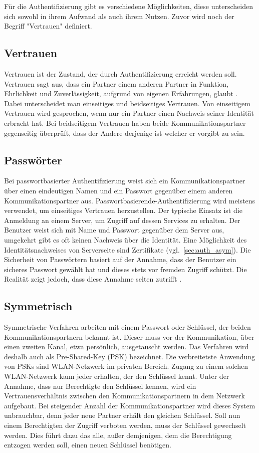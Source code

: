 \documentclass[11pt,a4paper]{report}
\begin{document}
Für die Authentifizierung gibt es verschiedene Möglichkeiten, diese unterscheiden sich sowohl in ihrem Aufwand als auch ihrem Nutzen. Zuvor wird noch der Begriff "Vertrauen" definiert.

\subsection{Vertrauen}

Vertrauen ist der Zustand, der durch Authentifizierung erreicht werden soll. Vertrauen sagt aus, dass ein Partner einem anderen Partner in Funktion, Ehrlichkeit und Zuverlässigkeit, aufgrund von eigenen Erfahrungen, glaubt \cite{chen}. Dabei unterscheidet man einseitiges und beidseitiges Vertrauen. Von einseitigem Vertrauen wird gesprochen, wenn nur ein Partner einen Nachweis seiner Identität erbracht hat. Bei beidseitigem Vertrauen haben beide Kommunikationspartner gegenseitig überprüft, dass der Andere derjenige ist welcher er vorgibt zu sein.

\subsection{Passwörter}

Bei passwortbasierter Authentifizierung weist sich ein Kommunikationspartner über einen eindeutigen Namen und ein Passwort gegenüber einem anderen Kommunikationspartner aus. Passwortbasierende-Authentifizierung wird meistens verwendet, um einseitiges Vertrauen herzustellen. Der typische Einsatz ist die Anmeldung an einem Server, um Zugriff auf dessen Services zu erhalten. Der Benutzer weist sich mit Name und Passwort gegenüber dem Server aus, umgekehrt gibt es oft keinen Nachweis über die Identität. Eine Möglichkeit des Identitätsnachweises von Serverseite sind Zertifikate (vgl.~\ref{sec:auth_asym}). Die Sicherheit von Passwörtern basiert auf der Annahme, dass der Benutzer ein sicheres Passwort gewählt hat und dieses stets vor fremden Zugriff schützt. Die Realität zeigt jedoch, dass diese Annahme selten zutrifft \cite[s.~2]{gutmann}.

\subsection{Symmetrisch}

Symmetrische Verfahren arbeiten mit einem Passwort oder Schlüssel, der beiden Kommunikationspartnern bekannt ist. Dieser muss vor der Kommunikation, über einen zweiten Kanal, etwa persönlich, ausgetauscht werden. Das Verfahren wird deshalb auch als Pre-Shared-Key (PSK) bezeichnet. Die verbreitetste Anwendung von PSKs sind WLAN-Netzwerk im privaten Bereich. Zugang zu einem solchen WLAN-Netzwerk kann jeder erhalten, der den Schlüssel kennt. Unter der Annahme, dass nur Berechtigte den Schlüssel kennen, wird ein Vertrauensverhältnis zwischen den Kommunikationspartnern in dem Netzwerk aufgebaut. Bei steigender Anzahl der Kommunikationspartner wird dieses System unbrauchbar, denn jeder neue Partner erhält den gleichen Schlüssel. Soll nun einem Berechtigten der Zugriff verboten werden, muss der Schlüssel gewechselt werden. Dies führt dazu das alle, außer demjenigen, dem die Berechtigung entzogen werden soll, einen neuen Schlüssel benötigen.
\end{document}
